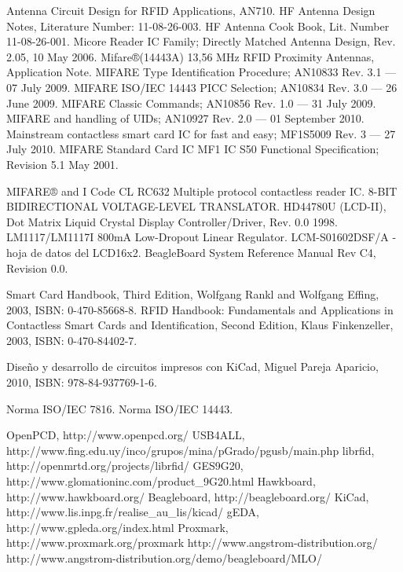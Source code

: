 \begin{thebibliography}{200}

 Antenna Circuit Design for RFID Applications, AN710.
 HF Antenna Design Notes, Literature Number: 11-08-26-003.
 HF Antenna Cook Book, Lit. Number 11-08-26-001.
 Micore Reader IC Family; Directly Matched Antenna Design, Rev. 2.05, 10 May 2006.
 Mifare®(14443A) 13,56 MHz RFID Proximity Antennas, Application Note.
\bibitem{} MIFARE Type Identification Procedure; AN10833 Rev. 3.1 — 07 July 2009.
\bibitem{} MIFARE ISO/IEC 14443 PICC Selection; AN10834 Rev. 3.0 — 26 June 2009.
\bibitem{} MIFARE Classic Commands; AN10856 Rev. 1.0 — 31 July 2009.
\bibitem{} MIFARE and handling of UIDs; AN10927 Rev. 2.0 — 01 September 2010.
\bibitem{} Mainstream contactless smart card IC for fast and easy; MF1S5009 Rev. 3 — 27 July 2010.
\bibitem{} MIFARE Standard Card IC MF1 IC S50 Functional Specification; Revision 5.1 May 2001.

 MIFARE® and I Code CL RC632 Multiple protocol contactless reader IC.
 8-BIT BIDIRECTIONAL VOLTAGE-LEVEL TRANSLATOR.
 HD44780U (LCD-II), Dot Matrix Liquid Crystal Display Controller/Driver, Rev. 0.0 1998. 
 LM1117/LM1117I 800mA Low-Dropout Linear Regulator.
 LCM-S01602DSF/A - hoja de datos del LCD16x2.
 BeagleBoard System Reference Manual Rev C4, Revision 0.0.

 Smart Card Handbook, Third Edition, Wolfgang Rankl and Wolfgang Effing, 2003, ISBN: 0-470-85668-8. 
 RFID Handbook: Fundamentals and Applications in Contactless Smart Cards and Identification,
Second Edition, Klaus Finkenzeller, 2003, ISBN: 0-470-84402-7. 

 Diseño y desarrollo de circuitos impresos con KiCad, Miguel Pareja Aparicio, 2010, ISBN: 978-84-937769-1-6.


 Norma ISO/IEC 7816.
 Norma ISO/IEC 14443.



 OpenPCD, http://www.openpcd.org/
 USB4ALL, http://www.fing.edu.uy/inco/grupos/mina/pGrado/pgusb/main.php
 librfid, http://openmrtd.org/projects/librfid/
 GES9G20, http://www.glomationinc.com/product\_9G20.html
 Hawkboard, http://www.hawkboard.org/
 Beagleboard, http://beagleboard.org/
 KiCad, http://www.lis.inpg.fr/realise\_au\_lis/kicad/
 gEDA, http://www.gpleda.org/index.html
 Proxmark, http://www.proxmark.org/proxmark
 http://www.angstrom-distribution.org/
 http://www.angstrom-distribution.org/demo/beagleboard/MLO/


\end{thebibliography}

